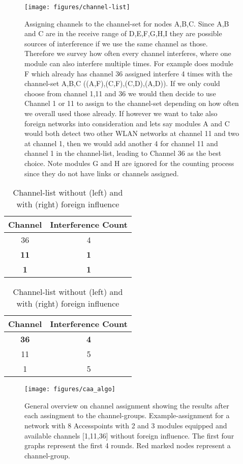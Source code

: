     \newpage
    
    \begin{figure}[h!]
      \centering
      \texttt{[image: figures/channel-list]}
      \caption{Assigning channels to the channel-set for nodes A,B,C. Since A,B and C are in the receive range of D,E,F,G,H,I they are possible sources
	of interference if we use the same channel as those. Therefore we survey how often every channel interferes, where one module can also interfere multiple times.
	For example does module F which already has channel 36 assigned interfere 4 times with the channel-set A,B,C ((A,F),(C,F),(C,D),(A,D)). If we only could choose from 
	channel 1,11 and 36 we would then decide to use Channel 1 or 11 to assign to the channel-set depending on how often we overall used those already.
	If however we want to take also foreign networks into consideration and lets say modules A and C would both detect two other \ac{WLAN} networks at channel 11 and two
	at channel 1, then we would add another 4 for channel 11 and channel 1 in the channel-list, leading to Channel 36 as the best choice. Note modules G and H are ignored 
	for the counting process since they do not have links or channels assigned.}
      \label{fig:channel-list}
    \end{figure}
    
    \begin{table}[h!]
      \centering
      \begin{tabular}{|c|c|}\hline
	Channel & Interference Count\\ \hline
	36 & 4 \\ \hline
	\textbf{11} & \textbf{1} \\ \hline
	\textbf{1} & \textbf{1} \\ \hline
      \end{tabular}
      \begin{tabular}{|c|c|}\hline
	Channel & Interference Count\\ \hline
	\textbf{36} & \textbf{4} \\ \hline
	11 & 5 \\ \hline
	1 & 5  \\ \hline
      \end{tabular}
      \caption{Channel-list without (left) and with (right) foreign influence}
    \end{table}
    
    \newpage
    
    \begin{figure}[h!]
      \centering
      \texttt{[image: figures/caa\_algo]}
      \caption{General overview on channel assignment showing the results after each assingment to the channel-groups. 
	Example-assignment for a network with 8 Accesspoints with 2 and 3 modules equipped and available channels [1,11,36] without foreign influence. 
	The first four graphs represent the first 4 rounds. Red marked nodes represent a channel-group.}
      \label{fig:caa_algo}
    \end{figure}

